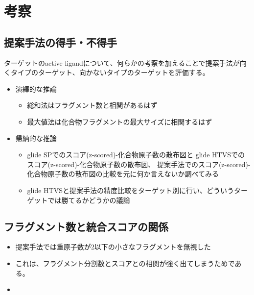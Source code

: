 \chapter{考察}

\section{提案手法の得手・不得手}
ターゲットのactive ligandについて、何らかの考察を加えることで提案手法が向くタイプのターゲット、向かないタイプのターゲットを評価する。
\begin{itemize}
\item 演繹的な推論
	\begin{itemize}
	\item 総和法はフラグメント数と相関があるはず
	\item 最大値法は化合物フラグメントの最大サイズに相関するはず
	\end{itemize}
\item 帰納的な推論
	\begin{itemize}
	\item glide SPでのスコア(z-scored)-化合物原子数の散布図と
		glide HTVSでのスコア(z-scored)-化合物原子数の散布図、
		提案手法でのスコア(z-scored)-化合物原子数の散布図の比較を元に何か言えないか調べてみる
	\item glide HTVSと提案手法の精度比較をターゲット別に行い、どういうターゲットでは勝てるかどうかの議論
	\end{itemize}
\end{itemize}

\section{フラグメント数と統合スコアの関係}

\begin{itemize} 
\item 提案手法では重原子数が2以下の小さなフラグメントを無視した
\item これは、フラグメント分割数とスコアとの相関が強く出てしまうためである。
\item 
\end{itemize}


